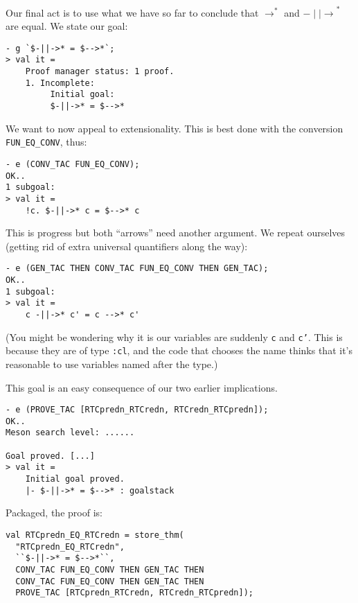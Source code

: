 \documentclass[12pt]{article}
\newcommand{\mathpredn}{\mathbin{-\!\!\!\mid\mid\!\rightarrow}}
\begin{document}
Our final act is to use what we have so far to conclude that
$\rightarrow^*$ and $\mathpredn^*$ are equal.  We state our goal:
\begin{session}\begin{verbatim}
- g `$-||->* = $-->*`;
> val it =
    Proof manager status: 1 proof.
    1. Incomplete:
         Initial goal:
         $-||->* = $-->*
\end{verbatim}\end{session}
We want to now appeal to extensionality.  This is best done with the
conversion \texttt{FUN\_EQ\_CONV}, thus:
\begin{session}\begin{verbatim}
- e (CONV_TAC FUN_EQ_CONV);
OK..
1 subgoal:
> val it =
    !c. $-||->* c = $-->* c
\end{verbatim}\end{session}
This is progress but both ``arrows'' need another argument.  We repeat
ourselves (getting rid of extra universal quantifiers along the way):
\begin{session}\begin{verbatim}
- e (GEN_TAC THEN CONV_TAC FUN_EQ_CONV THEN GEN_TAC);
OK..
1 subgoal:
> val it =
    c -||->* c' = c -->* c'
\end{verbatim}\end{session}
(You might be wondering why it is our variables are suddenly
\texttt{c} and \texttt{c'}.  This is because they are of type
\texttt{:cl}, and the code that chooses the name thinks that it's
reasonable to use variables named after the type.)

This goal is an easy consequence of our two earlier implications.
\begin{session}\begin{verbatim}
- e (PROVE_TAC [RTCpredn_RTCredn, RTCredn_RTCpredn]);
OK..
Meson search level: ......

Goal proved. [...]
> val it =
    Initial goal proved.
    |- $-||->* = $-->* : goalstack
\end{verbatim}\end{session}
Packaged, the proof is:
\begin{session}\begin{verbatim}
val RTCpredn_EQ_RTCredn = store_thm(
  "RTCpredn_EQ_RTCredn",
  ``$-||->* = $-->*``,
  CONV_TAC FUN_EQ_CONV THEN GEN_TAC THEN
  CONV_TAC FUN_EQ_CONV THEN GEN_TAC THEN
  PROVE_TAC [RTCpredn_RTCredn, RTCredn_RTCpredn]);
\end{verbatim}\end{session}
\end{document}
